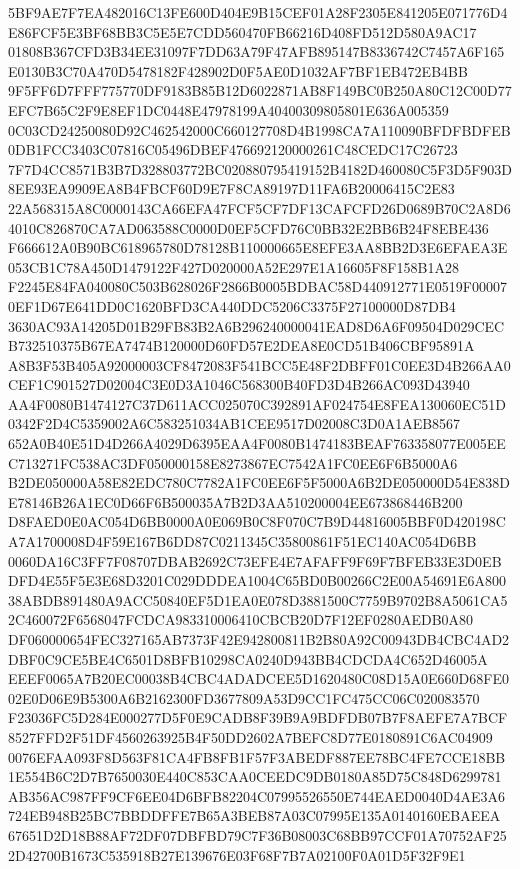 \documentclass[UTF8,fontset=fandol,zihao=-4,a4paper]{ctexart}
\begin{document}
{{5BF9AE7F7EA482016C13FE600D404E9B15CEF01A28F2305E841205E071776D4E86FCF5E3BF68BB3C5E5E7CDD560470FB66216D408FD512D580A9AC17
01808B367CFD3B34EE31097F7DD63A79F47AFB895147B8336742C7457A6F165E0130B3C70A470D5478182F428902D0F5AE0D1032AF7BF1EB472EB4BB
9F5FF6D7FFF775770DF9183B85B12D6022871AB8F149BC0B250A80C12C00D77EFC7B65C2F9E8EF1DC0448E47978199A40400309805801E636A005359
0C03CD24250080D92C462542000C660127708D4B1998CA7A110090BFDFBDFEB0DB1FCC3403C07816C05496DBEF476692120000261C48CEDC17C26723
7F7D4CC8571B3B7D328803772BC020880795419152B4182D460080C5F3D5F903D8EE93EA9909EA8B4FBCF60D9E7F8CA89197D11FA6B20006415C2E83
22A568315A8C0000143CA66EFA47FCF5CF7DF13CAFCFD26D0689B70C2A8D64010C826870CA7AD063588C0000D0EF5CFD76C0BB32E2BB6B24F8EBE436
F666612A0B90BC618965780D78128B110000665E8EFE3AA8BB2D3E6EFAEA3E053CB1C78A450D1479122F427D020000A52E297E1A16605F8F158B1A28
F2245E84FA040080C503B628026F2866B0005BDBAC58D440912771E0519F000070EF1D67E641DD0C1620BFD3CA440DDC5206C3375F27100000D87DB4
3630AC93A14205D01B29FB83B2A6B296240000041EAD8D6A6F09504D029CECB732510375B67EA7474B120000D60FD57E2DEA8E0CD51B406CBF95891A
A8B3F53B405A92000003CF8472083F541BCC5E48F2DBFF01C0EE3D4B266AA0CEF1C901527D02004C3E0D3A1046C568300B40FD3D4B266AC093D43940
AA4F0080B1474127C37D611ACC025070C392891AF024754E8FEA130060EC51D0342F2D4C5359002A6C583251034AB1CEE9517D02008C3D0A1AEB8567
652A0B40E51D4D266A4029D6395EAA4F0080B1474183BEAF763358077E005EEC713271FC538AC3DF050000158E8273867EC7542A1FC0EE6F6B5000A6
B2DE050000A58E82EDC780C7782A1FC0EE6F5F5000A6B2DE050000D54E838DE78146B26A1EC0D66F6B500035A7B2D3AA510200004EE673868446B200
D8FAED0E0AC054D6BB0000A0E069B0C8F070C7B9D44816005BBF0D420198CA7A1700008D4F59E167B6DD87C0211345C35800861F51EC140AC054D6BB
0060DA16C3FF7F08707DBAB2692C73EFE4E7AFAFF9F69F7BFEB33E3D0EBDFD4E55F5E3E68D3201C029DDDEA1004C65BD0B00266C2E00A54691E6A800
38ABDB891480A9ACC50840EF5D1EA0E078D3881500C7759B9702B8A5061CA52C460072F6568047FCDCA983310006410CBCB20D7F12EF0280AEDB0A80
DF060000654FEC327165AB7373F42E942800811B2B80A92C00943DB4CBC4AD2DBF0C9CE5BE4C6501D8BFB10298CA0240D943BB4CDCDA4C652D46005A
EEEF0065A7B20EC00038B4CBC4ADADCEE5D1620480C08D15A0E660D68FE002E0D06E9B5300A6B2162300FD3677809A53D9CC1FC475CC06C020083570
F23036FC5D284E000277D5F0E9CADB8F39B9A9BDFDB07B7F8AEFE7A7BCF8527FFD2F51DF4560263925B4F50DD2602A7BEFC8D77E0180891C6AC04909
0076EFAA093F8D563F81CA4FB8FB1F57F3ABEDF887EE78BC4FE7CCE18BB1E554B6C2D7B7650030E440C853CAA0CEEDC9DB0180A85D75C848D6299781
AB356AC987FF9CF6EE04D6BFB82204C07995526550E744EAED0040D4AE3A6724EB948B25BC7BBDDFFE7B65A3BEB87A03C07995E135A0140160EBAEEA
67651D2D18B88AF72DF07DBFBD79C7F36B08003C68BB97CCF01A70752AF252D42700B1673C535918B27E139676E03F68F7B7A02100F0A01D5F32F9E1
}}
\end{document}
